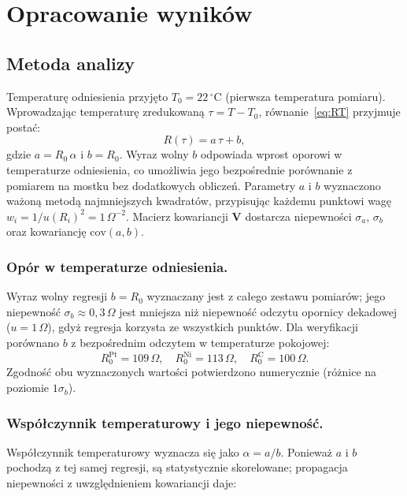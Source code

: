 \documentclass[12pt, a4paper]{article}
\begin{document}
\section{Opracowanie wyników}

\subsection{Metoda analizy}

Temperaturę odniesienia przyjęto $T_0 = 22\,^\circ\mathrm{C}$ (pierwsza temperatura pomiaru).
Wprowadzając temperaturę zredukowaną $\tau = T - T_0$, równanie~\eqref{eq:RT} przyjmuje postać:
\begin{equation}
    R(\tau) = a\,\tau + b,
    \label{eq:model}
\end{equation}
gdzie $a = R_0\,\alpha$ i $b = R_0$.
Wyraz wolny $b$ odpowiada wprost oporowi w temperaturze odniesienia, co umożliwia
jego bezpośrednie porównanie z pomiarem na mostku bez dodatkowych obliczeń.
Parametry $a$ i $b$ wyznaczono ważoną metodą najmniejszych kwadratów,
przypisując każdemu punktowi wagę $w_i = 1/{u(R_i)}^2 = 1\,\Omega^{-2}$.
Macierz kowariancji $\boldsymbol{V}$ dostarcza niepewności $\sigma_a$, $\sigma_b$ oraz
kowariancję $\mathrm{cov}(a,b)$.

\subsubsection{Opór w temperaturze odniesienia.}
Wyraz wolny regresji $b = R_0$ wyznaczany jest z całego zestawu pomiarów; jego niepewność
$\sigma_b \approx 0{,}3\,\Omega$ jest mniejsza niż niepewność odczytu opornicy dekadowej
($u = 1\,\Omega$), gdyż regresja korzysta ze wszystkich punktów.
Dla weryfikacji porównano $b$ z bezpośrednim odczytem w temperaturze pokojowej:
\begin{equation}
    R_0^{\mathrm{Pt}} = 109\,\Omega, \quad
    R_0^{\mathrm{Ni}} = 113\,\Omega, \quad
    R_0^{\mathrm{C}}  = 100\,\Omega.
    \label{eq:R0meas}
\end{equation}
Zgodność obu wyznaczonych wartości potwierdzono numerycznie (różnice na poziomie $1\sigma_b$).

\subsubsection{Współczynnik temperaturowy i jego niepewność.}
Współczynnik temperaturowy wyznacza się jako $\alpha = a/b$.
Ponieważ $a$ i $b$ pochodzą z tej samej regresji, są statystycznie skorelowane;
propagacja niepewności z uwzględnieniem kowariancji daje:
\end{document}
